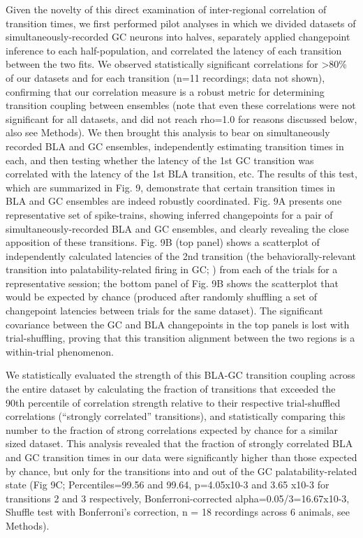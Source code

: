 \begin{refsection}
Given the novelty of this direct examination of inter-regional correlation of transition times, we first performed pilot analyses in which we divided datasets of simultaneously-recorded GC neurons into halves, separately applied changepoint inference to each half-population, and correlated the latency of each transition between the two fits. We observed statistically significant correlations for >80\% of our datasets and for each transition (n=11 recordings; data not shown), confirming that our correlation measure is a robust metric for determining transition coupling between ensembles (note that even these correlations were not significant for all datasets, and did not reach rho=1.0 for reasons discussed below, also see Methods). 
We then brought this analysis to bear on simultaneously recorded BLA and GC ensembles, independently estimating transition times in each, and then testing whether the latency of the 1st GC transition was correlated with the latency of the 1st BLA transition, etc. The results of this test, which are summarized in Fig. 9, demonstrate that certain transition times in BLA and GC ensembles are indeed robustly coordinated. Fig. 9A presents one representative set of spike-trains, showing inferred changepoints for a pair of simultaneously-recorded BLA and GC ensembles, and clearly revealing the close apposition of these transitions. Fig. 9B (top panel) shows a scatterplot of independently calculated latencies of the 2nd transition (the behaviorally-relevant transition into palatability-related firing in GC; \cite{sadacca2016a,mukherjee2019a}) from each of the trials for a representative session; the bottom panel of Fig. 9B shows the scatterplot that would be expected by chance (produced after randomly shuffling a set of changepoint latencies between trials for the same dataset). The significant covariance between the GC and BLA changepoints in the top panels is lost with trial-shuffling, proving that this transition alignment between the two regions is a within-trial phenomenon.

We statistically evaluated the strength of this BLA-GC transition coupling across the entire dataset by calculating the fraction of transitions that exceeded the 90th percentile of correlation strength relative to their respective trial-shuffled correlations (“strongly correlated” transitions), and statistically comparing this number to the fraction of strong correlations expected by chance for a similar sized dataset. This analysis revealed that the fraction of strongly correlated BLA and GC transition times in our data were significantly higher than those expected by chance, but only for the transitions into and out of the GC palatability-related state (Fig 9C; Percentiles=99.56 and 99.64, p=4.05x10-3 and 3.65 x10-3 for transitions 2 and 3 respectively, Bonferroni-corrected alpha=0.05/3=16.67x10-3, Shuffle test with Bonferroni’s correction, n = 18 recordings across 6 animals, see Methods). 


\end{refsection}
